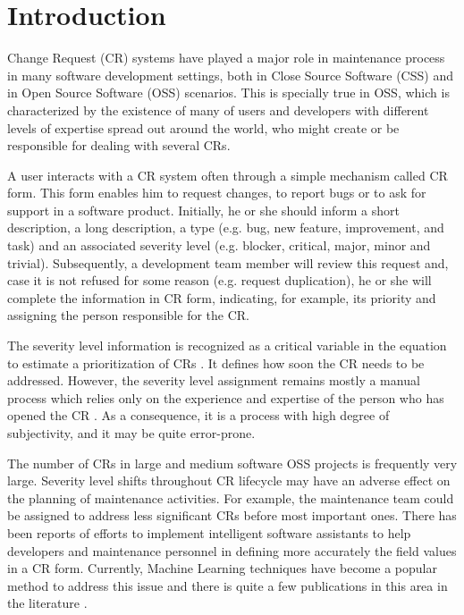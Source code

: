 \documentclass[10pt, conference]{IEEEtran}
\begin{document}
\section{Introduction}
Change Request (CR) systems have played a major role in maintenance process in many software development settings, both in Close Source Software (CSS) and in Open Source Software (OSS) scenarios. This is specially true in OSS, which is characterized by the existence of many of users and developers with different levels of expertise spread out around the world, who might create or be responsible for dealing with several CRs\cite{Cavalcanti2014}. 

A user interacts with a CR system often through a simple mechanism called CR form. This form enables him to request changes, to report bugs or to ask for support in a software product\cite{Sommerville2010}. Initially, he or she should inform a short description, a long description, a type (e.g. bug, new feature, improvement, and task) and an associated severity level (e.g. blocker, critical, major, minor and trivial). Subsequently, a development team member will review this request and, case it is not refused for some reason (e.g. request duplication), he or she will complete the information in CR form, indicating, for example, its priority and assigning the person responsible for the CR. 

The severity level information is recognized as a critical variable in the equation to estimate a prioritization of CRs \cite{Tian2012}. It defines how soon the CR needs to be addressed\cite{Lamkanfi2010}. However, the severity level assignment remains mostly a manual process which relies only on the experience and expertise of the person who has opened the CR \cite{Cavalcanti2014, Tian2012, Lamkanfi2010}. As a consequence, it is a process with high degree of subjectivity, and it may be quite error-prone. 

The number of CRs in large and medium software OSS projects \cite{Lamkanfi2011} is frequently very large. Severity level shifts throughout CR lifecycle may have an adverse effect on the planning of maintenance activities. For example, the maintenance team could be assigned to address less significant CRs before  most important ones. There has been reports of efforts to implement intelligent software assistants to help developers and maintenance personnel in defining more accurately the field values in a CR form. Currently, Machine Learning techniques have become a popular method to address this issue and there is quite a few publications in this area in the literature \cite{Cavalcanti2014}. 
\end{document}
